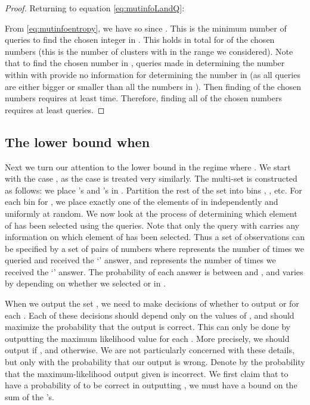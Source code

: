 \documentclass[12pt]{article}
\begin{document}
\begin{proof}
Returning to equation \ref{eq:mutinfoLandQ}: 


From  \eqref{eq:mutinfoentropy}, we have  so  since . This is the minimum number of queries to find the chosen integer in . This holds in total for  of the  chosen numbers (this is the number of clusters  with  in the range we considered). Note that to find the chosen number in , queries made in determining the number within  with  provide no information for determining the number in  (as all queries are either bigger or smaller than all the numbers in ). Then finding  of the  chosen numbers requires at least  time. Therefore, finding all  of the chosen numbers requires at least  queries. \qedhere
\end{proof}

\subsection{The lower bound when }


Next we turn our attention to the lower bound in the regime where . We start with the case , as the case  is treated very similarly. 
The multi-set  is constructed as follows: we place  's and  's in . Partition the rest of the set  into bins , , etc. 
For each bin  for , we place exactly one of the elements of  in  independently and uniformly at random. We now look at the process of determining which element of  has
been selected using the queries. Note that only the query with  carries any information on which element of  has been selected. Thus a set of observations
can be specified by a set of pairs of numbers  where  represents the number of times we queried  and received the `' answer, 
and  represents the number of times we received the `' answer. The probability of each answer is between  and , and varies by  depending on 
whether we selected  or  in . 

When we output the set , we need to make  decisions of whether to output  or  for each . Each of these decisions should depend only on the 
values of , and should maximize the probability that the output is correct. This can only be done by outputting the maximum likelihood value for each . 
More precisely, we should output  if , and  otherwise. We are not particularly concerned with these details, but 
only with the probability that our output is wrong. Denote by  the probability that the maximum-likelihood output given  is incorrect. 
We first claim that to have a probability of  to be correct in outputting , we must have a bound on the sum of the 's. 
\end{document}
